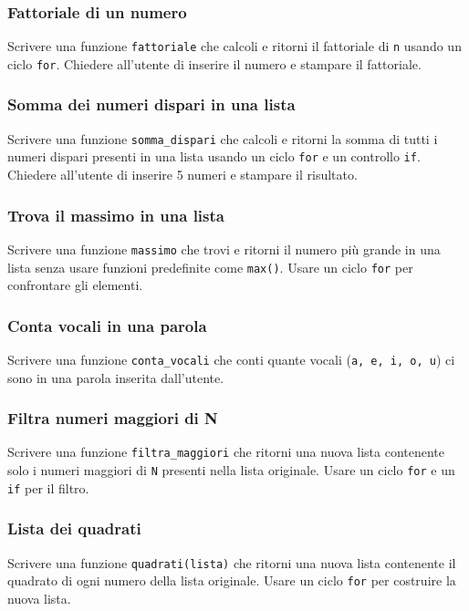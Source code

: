 \documentclass[a4paper,12pt]{article}
\begin{document}
	\subsubsection{Fattoriale di un numero}
	Scrivere una funzione \texttt{fattoriale} che calcoli e ritorni il fattoriale di \texttt{n} usando un ciclo \texttt{for}.  
	Chiedere all'utente di inserire il numero e stampare il fattoriale.
	
	\subsubsection{Somma dei numeri dispari in una lista}
	Scrivere una funzione \texttt{somma\_dispari} che calcoli e ritorni la somma di tutti i numeri dispari presenti in una lista usando un ciclo \texttt{for} e un controllo \texttt{if}.  
	Chiedere all'utente di inserire 5 numeri e stampare il risultato.
	
	\subsubsection{Trova il massimo in una lista}
	Scrivere una funzione \texttt{massimo} che trovi e ritorni il numero più grande in una lista senza usare funzioni predefinite come \texttt{max()}.  
	Usare un ciclo \texttt{for} per confrontare gli elementi.
	
	\subsubsection{Conta vocali in una parola}
	Scrivere una funzione \texttt{conta\_vocali} che conti quante vocali (\texttt{a, e, i, o, u}) ci sono in una parola inserita dall'utente.  
	
	\subsubsection{Filtra numeri maggiori di N}
	Scrivere una funzione \texttt{filtra\_maggiori} che ritorni una nuova lista contenente solo i numeri maggiori di \texttt{N} presenti nella lista originale.  
	Usare un ciclo \texttt{for} e un \texttt{if} per il filtro.
	
	\subsubsection{Lista dei quadrati}
	Scrivere una funzione \texttt{quadrati(lista)} che ritorni una nuova lista contenente il quadrato di ogni numero della lista originale.  
	Usare un ciclo \texttt{for} per costruire la nuova lista.
	
\end{document}
